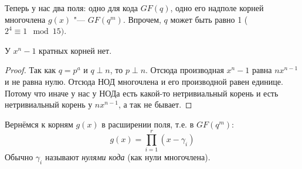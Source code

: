 \begin{Rem}
	Теперь у нас два поля: одно для кода $GF(q)$, одно его надполе
	корней многочлена $g(x)$ "--- $GF(q^m)$.
	Впрочем, $q$ может быть равно 1 ($2^4\equiv 1 \mod 15)$.
\end{Rem}

\begin{lemma}
	У $x^n-1$ кратных корней нет.
\end{lemma}
\begin{proof}
	Так как $q=p^a$ и $q \perp n$, то $p \perp n$.
	Отсюда производная $x^n-1$ равна $nx^{n-1}$ и не равна нулю.
	Отсюда НОД многочлена и его производной равен единице.
	Потому что иначе у нас у НОДа есть какой-то нетривиальный корень
	и есть нетривиальный корень у $nx^{n-1}$, а так не бывает.
\end{proof}

Вернёмся к корням $g(x)$ в расширении поля, т.е. в $GF(q^m)$:
\[
g(x) = \prod\limits_{i=1}^r (x-\gamma_i)
\]
Обычно $\gamma_i$ называют \textit{нулями кода} (как нули многочлена).

